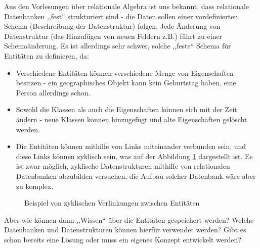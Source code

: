 Aus den Vorlesungen über relationale Algebra ist uns bekannt, dass relationale Datenbanken ,,fest`` strukturiert sind - die Daten sollen einer vordefinierten Schema (Beschreibung der Datenstruktur) folgen. Jede Änderung von Datenstruktur (das Hinzufügen von neuen Feldern z.B.) führt zu einer Schemaänderung. Es ist allerdings sehr schwer, solche ,,feste`` Schema für Entitäten zu definieren, da:
\begin{itemize}
\item Verschiedene Entitäten können verschiedene Menge von Eigenschaften besitzen - ein geographisches Objekt kann kein Geburtstag haben, eine Person allerdings schon.
\item Sowohl die Klassen als auch die Eigenschaften können sich mit der Zeit ändern - neue Klassen können hinzugefügt und alte Eigenschaften gelöscht werden.
\item Die Entitäten können mithilfe von Links miteinander verbunden sein, und diese Links können zyklisch sein, was auf der Abbildung \ref{fig:cyclent} dargestellt ist. Es ist zwar möglich, zyklische Datenstrukturen mithilfe von relationalen Datenbanken abzubilden versuchen, die Aufbau solcher Datenbank wäre aber zu komplex.
\end{itemize}

\begin{figure}[ht]
\vbox{\small}
\caption{Beispiel von zyklischen Verlinkungen zwischen Entitäten}
\label{fig:cyclent}
\end{figure}
Aber wie können dann ,,Wissen`` über die Entitäten gespeichert werden? Welche Datenbanken und Datenstrukturen können hierfür verwendet werden? Gibt es schon bereits eine Lösung oder muss ein eigenes Konzept entwickelt werden?

